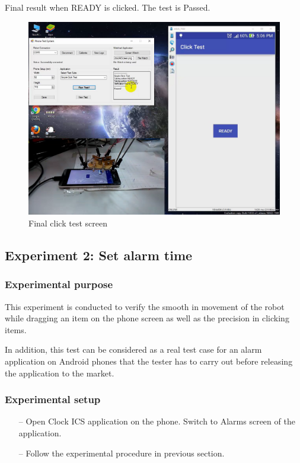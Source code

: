 Final result when READY is clicked. The test is Passed.
	\begin{figure}[H]
		\centering
		\includegraphics[scale=0.5]{Chapters/Fig/click_final.png}
		\caption{Final click test screen}
		\label{fig:click_final}
	\end{figure}

\subsection{Experiment 2: Set alarm time}
\subsubsection{Experimental purpose}
This experiment is conducted to verify the smooth in movement of the robot while dragging an item on the phone screen as well as the precision in clicking items.

In addition, this test can be considered as a real test case for an alarm application on Android phones that the tester has to carry out before releasing the application to the market.

\subsubsection{Experimental setup}
	\begin{itemize}
		\item[--]Open Clock ICS application on the phone. Switch to Alarms screen of the application.
		\item[--]Follow the experimental procedure in previous section.
	\end{itemize}

